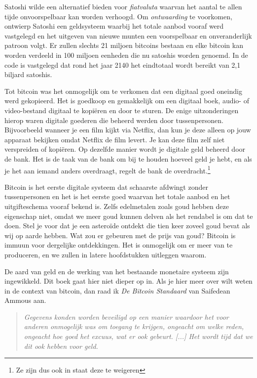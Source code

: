 \documentclass[
  letterpaper,
]{scrbook}
\begin{document}
Satoshi wilde een alternatief bieden voor \emph{fiatvaluta} waarvan het
aantal te allen tijde onvoorspelbaar kan worden verhoogd. Om
\emph{ontwaarding} te voorkomen, ontwierp Satoshi een geldsysteem
waarbij het totale aanbod vooraf werd vastgelegd en het uitgeven van
nieuwe munten een voorspelbaar en onveranderlijk patroon volgt. Er
zullen slechts 21 miljoen bitcoins bestaan en elke bitcoin kan worden
verdeeld in 100 miljoen eenheden die nu satoshis worden genoemd. In de
code is vastgelegd dat rond het jaar 2140 het eindtotaal wordt bereikt
van 2,1 biljard satoshis.

Tot bitcoin was het onmogelijk om te verkomen dat een digitaal goed
oneindig werd gekopieerd. Het is goedkoop en gemakkelijk om een digitaal
boek, audio- of video-bestand digitaal te kopiëren en door te sturen. De
enige uitzonderingen hierop waren digitale goederen die beheerd werden
door tussenpersonen. Bijvoorbeeld wanneer je een film kijkt via Netflix,
dan kun je deze alleen op jouw apparaat bekijken omdat Netflix de film
levert. Je kan deze film zelf niet verspreiden of kopiëren. Op dezelfde
manier wordt je digitale geld beheerd door de bank. Het is de taak van
de bank om bij te houden hoeveel geld je hebt, en als je het aan iemand
anders overdraagt, regelt de bank de overdracht.\footnote{Ze zijn dus
  ook in staat deze te weigeren}

Bitcoin is het eerste digitale systeem dat schaarste afdwingt zonder
tussenpersonen en het is het eerste goed waarvan het totale aanbod en
het uitgifteschema vooraf bekend is. Zelfs edelmetalen zoals goud hebben
deze eigenschap niet, omdat we meer goud kunnen delven als het rendabel
is om dat te doen. Stel je voor dat je een asteroïde ontdekt die tien
keer zoveel goud bevat als wij op aarde hebben. Wat zou er gebeuren met
de prijs van goud? Bitcoin is immuun voor dergelijke ontdekkingen. Het
is onmogelijk om er meer van te produceren, en we zullen in latere
hoofdstukken uitleggen waarom.

De aard van geld en de werking van het bestaande monetaire systeem zijn
ingewikkeld. Dit boek gaat hier niet dieper op in. Als je hier meer over
wilt weten in de context van bitcoin, dan raad ik \emph{De Bitcoin
Standaard} van Saifedean Ammous aan.

\begin{quote}
\emph{Gegevens konden worden beveiligd op een manier waardoor het voor
anderen onmogelijk was om toegang te krijgen, ongeacht om welke reden,
ongeacht hoe goed het excuus, wat er ook gebeurt. {[}...{]} Het wordt
tijd dat we dit ook hebben voor geld.}
\end{quote}
\end{document}
